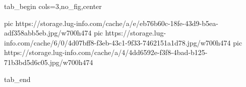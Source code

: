  
 
 
 
 


\ifcmt
  tab_begin cols=3,no_fig,center

     pic https://storage.lug-info.com/cache/a/e/eb76b60c-18fe-43d9-b5ea-adf358abb5eb.jpg/w700h474%
		 pic https://storage.lug-info.com/cache/6/0/4d07bff8-f3eb-43c1-9f33-7462151a1d78.jpg/w700h474%
		 pic https://storage.lug-info.com/cache/a/4/4dd6592e-f3f8-4bad-b125-71b3bd5d6c05.jpg/w700h474%

  tab_end
\fi

